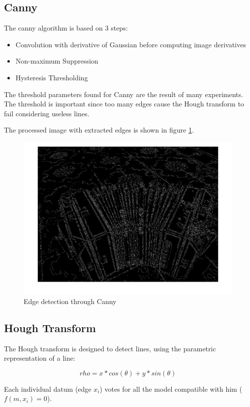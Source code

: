 \documentclass[11pt, oneside]{article}   	%
\begin{document}
\subsection{Canny} 
The canny algorithm is based on 3 steps:

\begin{itemize}
\item Convolution with derivative of Gaussian before computing image derivatives
\item Non-maximum Suppression
\item Hysteresis Thresholding
\end{itemize}

The threshold parameters found for Canny are the result of many experiments. The threshold is important since too many edges cause the Hough transform to fail considering useless lines.

The processed image with extracted edges is shown in figure \ref{edge}.

\begin{figure}

\includegraphics[width=0.8\linewidth]{edges.jpg}

\caption{Edge detection through Canny}
\label{edge}

\end{figure}

\subsection{Hough Transform} 
The Hough transform is designed to detect lines, using the parametric representation of a line:

$$rho = x*cos(\theta) + y*sin(\theta) $$

Each individual datum (edge $x_i$) votes for all the model compatible with him ( $f(m,x_i) = 0 $).
\end{document}
